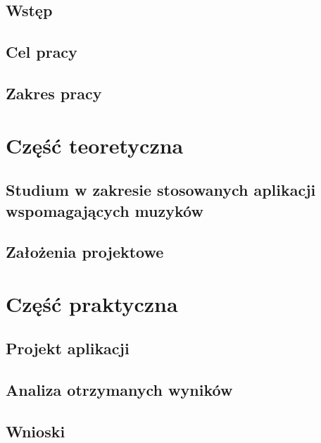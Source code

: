 \documentclass[12pt,a4paper,draft]{report}
\begin{document}
\tableofcontents
\chapter{Wstęp}
\chapter{Cel pracy}
\chapter{Zakres pracy}
\part{Część teoretyczna}
\chapter{Studium w zakresie stosowanych aplikacji wspomagających muzyków}
\chapter{Założenia projektowe}
\part{Część praktyczna}
\chapter{Projekt aplikacji}
\chapter{Analiza otrzymanych wyników}
\chapter{Wnioski}
\end{document}
